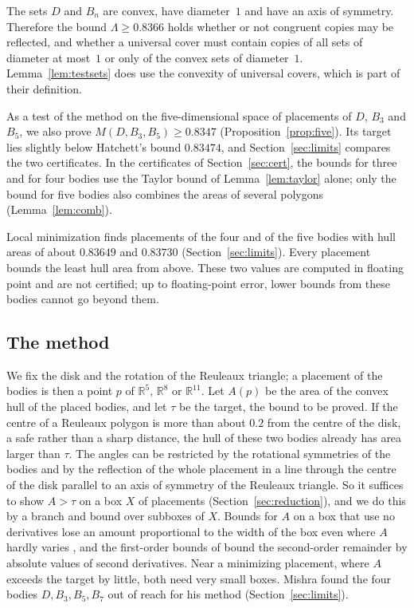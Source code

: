 \documentclass[11pt]{amsart}
\theoremstyle{definition}
\theoremstyle{remark}
\numberwithin{equation}{section}
\newcommand{\R}{\mathbb{R}}
\newcommand{\LBTHREE}{0.8347}
\newcommand{\LBFIVE}{0.8366}
\begin{document}
The sets $D$ and $B_n$ are convex, have diameter~$1$ and have an axis of symmetry. Therefore the bound $\Lambda\ge\LBFIVE$ holds whether or not congruent copies may be reflected, and whether a universal cover must contain copies of all sets of diameter at most~$1$ or only of the convex sets of diameter~$1$. Lemma~\ref{lem:testsets} does use the convexity of universal covers, which is part of their definition.

As a test of the method on the five-dimensional space of placements of $D$, $B_3$ and $B_5$, we also prove $M(D,B_3,B_5)\ge\LBTHREE$ (Proposition~\ref{prop:five}). Its target lies slightly below Hatchett's bound $0.83474$, and Section~\ref{sec:limits} compares the two certificates. In the certificates of Section~\ref{sec:cert}, the bounds for three and for four bodies use the Taylor bound of Lemma~\ref{lem:taylor} alone; only the bound for five bodies also combines the areas of several polygons (Lemma~\ref{lem:comb}).

Local minimization finds placements of the four and of the five bodies with hull areas of about $0.83649$ and $0.83730$ (Section~\ref{sec:limits}). Every placement bounds the least hull area from above. These two values are computed in floating point and are not certified; up to floating-point error, lower bounds from these bodies cannot go beyond them.

\subsection*{The method}
We fix the disk and the rotation of the Reuleaux triangle; a placement of the bodies is then a point $p$ of $\R^5$, $\R^8$ or $\R^{11}$. Let $A(p)$ be the area of the convex hull of the placed bodies, and let $\tau$ be the target, the bound to be proved. If the centre of a Reuleaux polygon is more than about $0.2$ from the centre of the disk, a safe rather than a sharp distance, the hull of these two bodies already has area larger than $\tau$. The angles can be restricted by the rotational symmetries of the bodies and by the reflection of the whole placement in a line through the centre of the disk parallel to an axis of symmetry of the Reuleaux triangle. So it suffices to show $A>\tau$ on a box $X$ of placements (Section~\ref{sec:reduction}), and we do this by a branch and bound over subboxes of $X$. Bounds for $A$ on a box that use no derivatives lose an amount proportional to the width of the box even where $A$ hardly varies \cite{Mis26,Xie26}, and the first-order bounds of \cite{Hat26,Zen26} bound the second-order remainder by absolute values of second derivatives. Near a minimizing placement, where $A$ exceeds the target by little, both need very small boxes. Mishra found the four bodies $D,B_3,B_5,B_7$ out of reach for his method (Section~\ref{sec:limits}).
\end{document}
